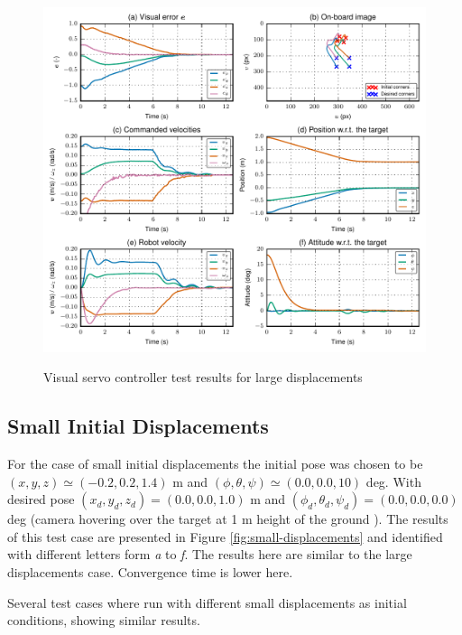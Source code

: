 \begin{figure}[!htb]
	\caption{Visual servo controller test results for large displacements}
	\centering
	\includegraphics[width=\textwidth]{content/chapter_06/images/exp_015_plot.pdf}
	\label{fig:large-displacements}
\end{figure}

\pagebreak

\subsection{Small Initial Displacements}
\label{sec:small-initial-displacements}

For the case of small initial displacements the initial pose was chosen to be $(x, y, z) \simeq (-0.2, 0.2, 1.4)$ m and $(\phi, \theta, \psi) \simeq (0.0, 0.0, 10)$ deg. With desired pose $(x_d, y_d, z_d) = (0.0, 0.0, 1.0)$ m and $(\phi_d, \theta_d, \psi_d) = (0.0, 0.0, 0.0)$ deg (camera hovering over the target at 1 m height of the ground ). The results of this test case are presented in Figure \ref{fig:small-displacements} and identified with different letters form \emph{a} to \emph{f}. The results here are similar to the large displacements case. Convergence time is lower here.

Several test cases where run with different small displacements as initial conditions, showing similar results. 

